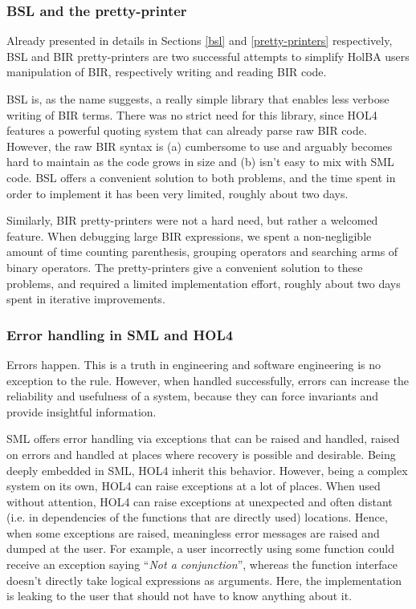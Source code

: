 \documentclass[10pt,a4paper]{article}
\begin{document}
\begin{multicols}{2}
\subsubsection{BSL and the pretty-printer}

Already presented in details in Sections \ref{bsl} and \ref{pretty-printers} respectively, BSL and BIR pretty-printers are two successful attempts to simplify HolBA users manipulation of BIR, respectively writing and reading BIR code.

BSL is, as the name suggests, a really simple library that enables less verbose writing of BIR terms. There was no strict need for this library, since HOL4 features a powerful quoting system that can already parse raw BIR code. However, the raw BIR syntax is (a) cumbersome to use and arguably becomes hard to maintain as the code grows in size and (b) isn't easy to mix with SML code. BSL offers a convenient solution to both problems, and the time spent in order to implement it has been very limited, roughly about two days.

Similarly, BIR pretty-printers were not a hard need, but rather a welcomed feature. When debugging large BIR expressions, we spent a non-negligible amount of time counting parenthesis, grouping operators and searching arms of binary operators. The pretty-printers give a convenient solution to these problems, and required a limited implementation effort, roughly about two days spent in iterative improvements.

\subsubsection{Error handling in SML and HOL4}

Errors happen. This is a truth in engineering and software engineering is no exception to the rule. However, when handled successfully, errors can increase the reliability and usefulness of a system, because they can force invariants and provide insightful information.

{SML} offers error handling via exceptions that can be raised and handled, raised on errors and handled at places where recovery is possible and desirable. Being deeply embedded in SML, HOL4 inherit this behavior. However, being a complex system on its own, HOL4 can raise exceptions at a lot of places. When used without attention, HOL4 can raise exceptions at unexpected and often distant (i.e. in dependencies of the functions that are directly used) locations. Hence, when some exceptions are raised, meaningless error messages are raised and dumped at the user. For example, a user incorrectly using some function could receive an exception saying ``\textit{Not a conjunction}'', whereas the function interface doesn't directly take logical expressions as arguments. Here, the implementation is leaking to the user that should not have to know anything about it.


\end{multicols}
\end{document}
